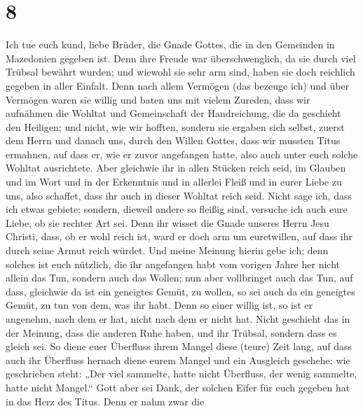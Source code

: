 \hypertarget{section-7}{%
\section{8}\label{section-7}}

 Ich tue euch kund, liebe Brüder, die Gnade Gottes, die in
den Gemeinden in Mazedonien gegeben ist.  Denn ihre Freude
war überschwenglich, da sie durch viel Trübsal bewährt wurden; und
wiewohl sie sehr arm sind, haben sie doch reichlich gegeben in aller
Einfalt.  Denn nach allem Vermögen (das bezeuge ich) und
über Vermögen waren sie willig  und baten uns mit vielem
Zureden, dass wir aufnähmen die Wohltat und Gemeinschaft der
Handreichung, die da geschieht den Heiligen;  und nicht,
wie wir hofften, sondern sie ergaben sich selbst, zuerst dem Herrn und
danach uns, durch den Willen Gottes,  dass wir mussten
Titus ermahnen, auf dass er, wie er zuvor angefangen hatte, also auch
unter euch solche Wohltat ausrichtete.  Aber gleichwie ihr
in allen Stücken reich seid, im Glauben und im Wort und in der
Erkenntnis und in allerlei Fleiß und in eurer Liebe zu uns, also
schaffet, dass ihr auch in dieser Wohltat reich seid. 
Nicht sage ich, dass ich etwas gebiete; sondern, dieweil andere so
fleißig sind, versuche ich auch eure Liebe, ob sie rechter Art sei.
 Denn ihr wisset die Gnade unseres Herrn Jesu Christi,
dass, ob er wohl reich ist, ward er doch arm um euretwillen, auf dass
ihr durch seine Armut reich würdet.  Und meine Meinung
hierin gebe ich; denn solches ist euch nützlich, die ihr angefangen habt
vom vorigen Jahre her nicht allein das Tun, sondern auch das Wollen;
 nun aber vollbringet auch das Tun, auf dass, gleichwie
da ist ein geneigtes Gemüt, zu wollen, so sei auch da ein geneigtes
Gemüt, zu tun von dem, was ihr habt.  Denn so einer
willig ist, so ist er angenehm, nach dem er hat, nicht nach dem er nicht
hat.  Nicht geschieht das in der Meinung, dass die
anderen Ruhe haben, und ihr Trübsal, sondern dass es gleich sei.
 So diene euer Überfluss ihrem Mangel diese (teure) Zeit
lang, auf dass auch ihr Überfluss hernach diene eurem Mangel und ein
Ausgleich geschehe;  wie geschrieben steht: „Der viel
sammelte, hatte nicht Überfluss, der wenig sammelte, hatte nicht
Mangel.``  Gott aber sei Dank, der solchen Eifer für euch
gegeben hat in das Herz des Titus.  Denn er nahm zwar die
